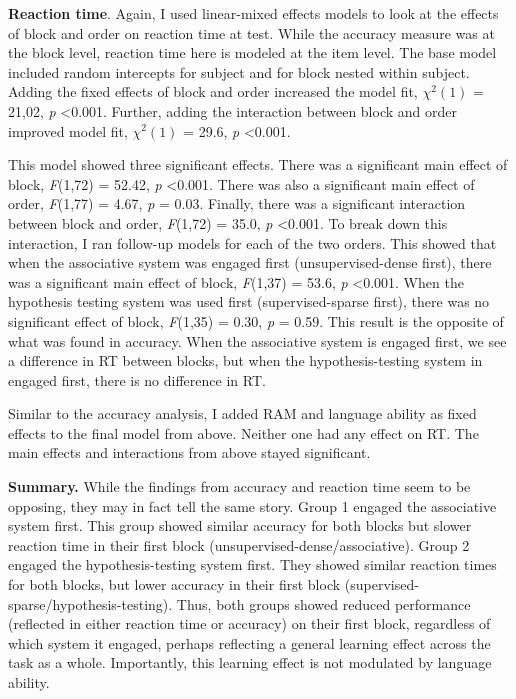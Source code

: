 \documentclass[../dissertation.tex]{subfiles}
\begin{document}
	\textbf{Reaction time}. Again, I used linear-mixed effects models to look at the effects of block and order on reaction time at test. While the accuracy measure was at the block level, reaction time here is modeled at the item level. The base model included random intercepts for subject and for block nested within subject. Adding the fixed effects of block and order increased the model fit, $\chi^{2}(1)$ = 21,02,  \textit{p} \textless 0.001. Further, adding the interaction between block and order improved model fit, $\chi^{2}(1)$ = 29.6,  \textit{p} \textless 0.001. \par
	This model showed three significant effects. There was a significant main effect of block, \textit{F}(1,72) = 52.42, \textit{p} \textless 0.001. There was also a significant main effect of order, \textit{F}(1,77) = 4.67, \textit{p} = 0.03. Finally, there was a significant interaction between block and order, \textit{F}(1,72) = 35.0, \textit{p} \textless 0.001. To break down this interaction, I ran follow-up models for each of the two orders. This showed that when the associative system was engaged first (unsupervised-dense first), there was a significant main effect of block, \textit{F}(1,37) = 53.6, \textit{p} \textless 0.001. When the hypothesis testing system was used first (supervised-sparse first), there was no significant effect of block, \textit{F}(1,35) = 0.30, \textit{p} = 0.59. This result is the opposite of what was found in accuracy. When the associative system is engaged first, we see a difference in RT between blocks, but when the hypothesis-testing system in engaged first, there is no difference in RT. \par
	Similar to the accuracy analysis, I added RAM and language ability as fixed effects to the final model from above. Neither one had any effect on RT. The main effects and interactions from above stayed significant. \par 
	\textbf{Summary.} While the findings from accuracy and reaction time seem to be opposing, they may in fact tell the same story. Group 1 engaged the associative system first. This group showed similar accuracy for both blocks but slower reaction time in their first block (unsupervised-dense/associative). Group 2 engaged the hypothesis-testing system first. They showed similar reaction times for both blocks, but lower accuracy in their first block (supervised-sparse/hypothesis-testing). Thus, both groups showed reduced performance (reflected in either reaction time or accuracy) on their first block, regardless of which system it engaged, perhaps reflecting a general learning effect across the task as a whole. Importantly, this learning effect is not modulated by language ability.
\end{document}
